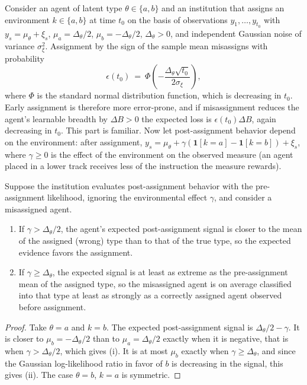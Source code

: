 Consider an agent of latent type $\theta\in\{a,b\}$ and an institution that assigns an environment $k\in\{a,b\}$ at time $t_0$ on the basis of observations $y_1,\dots,y_{t_0}$ with $y_s=\mu_\theta+\xi_s$, $\mu_a=\Delta_\theta/2$, $\mu_b=-\Delta_\theta/2$, $\Delta_\theta>0$, and independent Gaussian noise of variance $\sigma_\xi^2$. Assignment by the sign of the sample mean misassigns with probability
\begin{equation}
\epsilon(t_0)\ =\ \Phi\!\left(-\frac{\Delta_\theta\sqrt{t_0}}{2\sigma_\xi}\right),
\end{equation}
where $\Phi$ is the standard normal distribution function, which is decreasing in $t_0$. Early assignment is therefore more error-prone, and if misassignment reduces the agent's learnable breadth by $\Delta B>0$ the expected loss is $\epsilon(t_0)\Delta B$, again decreasing in $t_0$. This part is familiar. Now let post-assignment behavior depend on the environment: after assignment, $y_s=\mu_\theta+\gamma(\mathbf{1}[k=a]-\mathbf{1}[k=b])+\xi_s$, where $\gamma\geq 0$ is the effect of the environment on the observed measure (an agent placed in a lower track receives less of the instruction the measure rewards).

\begin{proposition}\label{prop:selfconfirm-dev}
Suppose the institution evaluates post-assignment behavior with the pre-assignment likelihood, ignoring the environmental effect $\gamma$, and consider a misassigned agent.
\begin{enumerate}\renewcommand{\labelenumi}{(\roman{enumi})}
\item If $\gamma>\Delta_\theta/2$, the agent's expected post-assignment signal is closer to the mean of the assigned (wrong) type than to that of the true type, so the expected evidence favors the assignment.
\item If $\gamma\geq\Delta_\theta$, the expected signal is at least as extreme as the pre-assignment mean of the assigned type, so the misassigned agent is on average classified into that type at least as strongly as a correctly assigned agent observed before assignment.
\end{enumerate}
\end{proposition}

\begin{proof}
Take $\theta=a$ and $k=b$. The expected post-assignment signal is $\Delta_\theta/2-\gamma$. It is closer to $\mu_b=-\Delta_\theta/2$ than to $\mu_a=\Delta_\theta/2$ exactly when it is negative, that is when $\gamma>\Delta_\theta/2$, which gives (i). It is at most $\mu_b$ exactly when $\gamma\geq\Delta_\theta$, and since the Gaussian log-likelihood ratio in favor of $b$ is decreasing in the signal, this gives (ii). The case $\theta=b$, $k=a$ is symmetric.
\end{proof}

